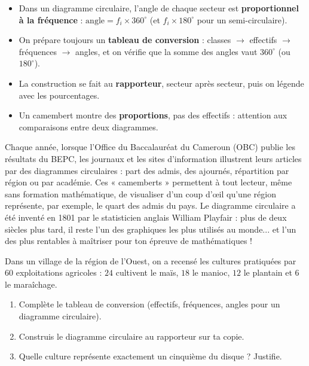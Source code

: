 \documentclass[11pt]{article}
\begin{document}
\begin{aretenir}
\begin{itemize}
\item Dans un diagramme circulaire, l'angle de chaque secteur est \textbf{proportionnel à la fréquence} : $\text{angle} = f_i \times 360^\circ$ (et $f_i \times 180^\circ$ pour un semi-circulaire).
\item On prépare toujours un \textbf{tableau de conversion} : classes $\rightarrow$ effectifs $\rightarrow$ fréquences $\rightarrow$ angles, et on vérifie que la somme des angles vaut $360^\circ$ (ou $180^\circ$).
\item La construction se fait au \textbf{rapporteur}, secteur après secteur, puis on légende avec les pourcentages.
\item Un camembert montre des \textbf{proportions}, pas des effectifs : attention aux comparaisons entre deux diagrammes.
\end{itemize}
\end{aretenir}

\begin{savaistu}
Chaque année, lorsque l'Office du Baccalauréat du Cameroun (OBC) publie les résultats du BEPC, les journaux et les sites d'information illustrent leurs articles par des diagrammes circulaires : part des admis, des ajournés, répartition par région ou par académie. Ces « camemberts » permettent à tout lecteur, même sans formation mathématique, de visualiser d'un coup d'œil qu'une région représente, par exemple, le quart des admis du pays. Le diagramme circulaire a été inventé en 1801 par le statisticien anglais William Playfair : plus de deux siècles plus tard, il reste l'un des graphiques les plus utilisés au monde... et l'un des plus rentables à maîtriser pour ton épreuve de mathématiques !
\end{savaistu}

\begin{exercice}
Dans un village de la région de l'Ouest, on a recensé les cultures pratiquées par $60$ exploitations agricoles : $24$ cultivent le maïs, $18$ le manioc, $12$ le plantain et $6$ le maraîchage.
\begin{enumerate}
\item Complète le tableau de conversion (effectifs, fréquences, angles pour un diagramme circulaire).
\item Construis le diagramme circulaire au rapporteur sur ta copie.
\item Quelle culture représente exactement un cinquième du disque ? Justifie.
\end{enumerate}
\end{exercice}
\end{document}
